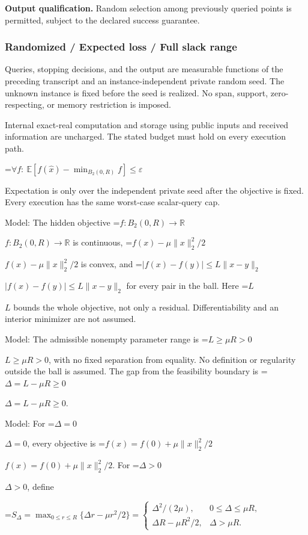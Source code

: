 \documentclass[10pt,a4paper]{article}
\newcommand{\AtlasMath}[1]{\par\begingroup\centering\setbox0=\hbox{$\displaystyle #1$}\ifdim\wd0>1.4\linewidth\typeout{ATLAS WIDE FORMULA: \the\wd0}\fi\ifdim\wd0>\linewidth\resizebox{\linewidth}{!}{\box0}\else\box0\fi\par\endgroup}
\newcommand{\AtlasInlineMath}[1]{\begingroup\setbox0=\hbox{$#1$}\ifdim\wd0>.4\linewidth\endgroup\AtlasMath{#1}\else\endgroup$#1$\fi}
\begin{document}
\textbf{Output qualification.} Random selection among previously queried points is permitted, subject to the declared success guarantee.



\subsubsection{Randomized / Expected loss / Full slack range}


Queries, stopping decisions, and the output are measurable functions of the preceding transcript and an instance-independent private random seed. The unknown instance is fixed before the seed is realized. No span, support, zero-respecting, or memory restriction is imposed.



Internal exact-real computation and storage using public inputs and received information are uncharged. The stated budget must hold on every execution path.




\AtlasMath{\forall f:\ \mathbb E[f(\widehat x)-\min_{B_2(0,R)}f]\le\varepsilon}




Expectation is only over the independent private seed after the objective is fixed. Every execution has the same worst-case scalar-query cap.



Model: The hidden objective \AtlasInlineMath{f:B_2(0,R)\to\mathbb R} is continuous, \AtlasInlineMath{f(x)-\mu\|x\|_2^2/2} is convex, and \AtlasInlineMath{|f(x)-f(y)|\le L\|x-y\|_2} for every pair in the ball. Here \AtlasInlineMath{L} bounds the whole objective, not only a residual. Differentiability and an interior minimizer are not assumed.



Model: The admissible nonempty parameter range is \AtlasInlineMath{L\ge\mu R>0}, with no fixed separation from equality. No definition or regularity outside the ball is assumed. The gap from the feasibility boundary is \AtlasInlineMath{\Delta=L-\mu R\ge0}.



Model: For \AtlasInlineMath{\Delta=0}, every objective is \AtlasInlineMath{f(x)=f(0)+\mu\|x\|_2^2/2}. For \AtlasInlineMath{\Delta>0}, define
\AtlasMath{S_\Delta=\max_{0\le r\le R}\{\Delta r-\mu r^2/2\}=\begin{cases}\Delta^2/(2\mu),&0\le\Delta\le\mu R,\\ \Delta R-\mu R^2/2,&\Delta>\mu R.\end{cases}}
\end{document}
